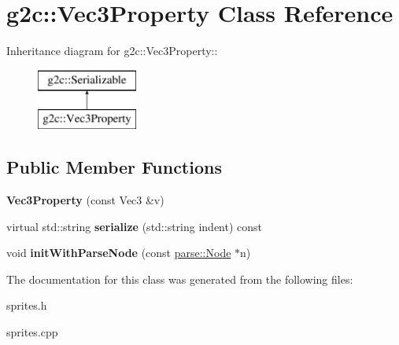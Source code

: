 \hypertarget{classg2c_1_1_vec3_property}{
\section{g2c::Vec3Property Class Reference}
\label{classg2c_1_1_vec3_property}
}
Inheritance diagram for g2c::Vec3Property::\begin{figure}[H]
\begin{center}
\leavevmode
\includegraphics[height=2cm]{classg2c_1_1_vec3_property}
\end{center}
\end{figure}
\subsection*{Public Member Functions}
\begin{DoxyCompactItemize}
\item 
\hypertarget{classg2c_1_1_vec3_property_ab2add6037ab51695b7d739b59bd08917}{
{\bfseries Vec3Property} (const Vec3 \&v)}
\label{classg2c_1_1_vec3_property_ab2add6037ab51695b7d739b59bd08917}

\item 
\hypertarget{classg2c_1_1_vec3_property_ab1e805ec02b9d9f69ba0b2847acb7458}{
virtual std::string {\bfseries serialize} (std::string indent) const }
\label{classg2c_1_1_vec3_property_ab1e805ec02b9d9f69ba0b2847acb7458}

\item 
\hypertarget{classg2c_1_1_vec3_property_ac4725a2803b95da44c0a2dae712036eb}{
void {\bfseries initWithParseNode} (const \hyperlink{classparse_1_1_node}{parse::Node} $\ast$n)}
\label{classg2c_1_1_vec3_property_ac4725a2803b95da44c0a2dae712036eb}

\end{DoxyCompactItemize}


The documentation for this class was generated from the following files:\begin{DoxyCompactItemize}
\item 
sprites.h\item 
sprites.cpp\end{DoxyCompactItemize}
